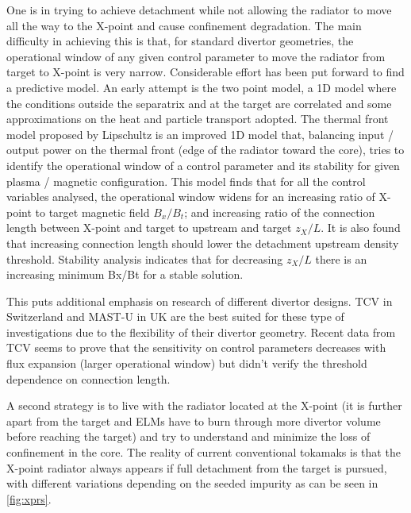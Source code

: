 One is in trying to achieve detachment while not allowing the radiator to move all the way to the X-point and cause confinement degradation. The main difficulty in achieving this is that, for standard divertor geometries, the operational window of any given control parameter to move the radiator from target to X-point is very narrow. Considerable effort has been put forward to find a predictive model. An early attempt is the two point model, a 1D model where the conditions outside the separatrix and at the target are correlated and some approximations on the heat and particle transport adopted.\cite{HOBBS1966,Hobbs1967,Mahdavi1981,Keilhacker1982,Harbour1984,Lackner1984,Stangeby2001} The thermal front model proposed by Lipschultz \cite{Lipschultz2016} is an improved 1D model that, balancing input / output power on the thermal front (edge of the radiator toward the core), tries to identify the operational window of a control parameter and its stability for given plasma / magnetic configuration. This model finds that for all the control variables analysed, the operational window widens for an increasing ratio of X-point to target magnetic field $B_x/B_t$; and increasing ratio of the connection length between X-point and target to upstream and target $z_X/L$. It is also found that increasing connection length should lower the detachment upstream density threshold. Stability analysis indicates that for decreasing $z_X/L$ there is an increasing minimum Bx/Bt for a stable solution.\cite{Lipschultz2016}

This puts additional emphasis on research of different divertor designs. TCV in Switzerland and MAST-U in UK are the best suited for these type of investigations due to the flexibility of their divertor geometry. Recent data from TCV seems to prove that the sensitivity on control parameters decreases with flux expansion (larger operational window) but didn’t verify the threshold dependence on connection length. \cite{Theiler2017}

A second strategy is to live with the radiator located at the X-point (it is further apart from the target and ELMs have to burn through more divertor volume before reaching the target) and try to understand and minimize the loss of confinement in the core. The reality of current conventional tokamaks is that the X-point radiator always appears if full detachment from the target is pursued, with different variations depending on the seeded impurity as can be seen in \autoref{fig:xprs}.

